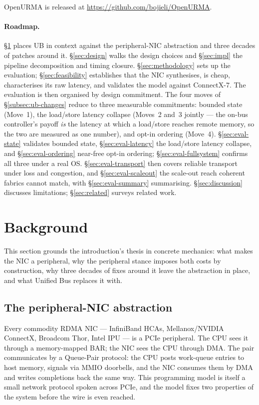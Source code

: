 \documentclass[10pt,twocolumn]{article}
\begin{document}
\noindent OpenURMA is released at
\url{https://github.com/bojieli/OpenURMA}.

\paragraph{Roadmap.}
\S\ref{sec:bg} places UB in context against the
peripheral-NIC abstraction and three decades of patches around it.
\S\ref{sec:design} walks the design choices and \S\ref{sec:impl}
the pipeline decomposition and timing closure.
\S\ref{sec:methodology} sets up the evaluation;
\S\ref{sec:feasibility} establishes that the NIC synthesises, is
cheap, characterises its raw latency, and validates the model
against ConnectX-7. The evaluation is then
organised by design commitment. The four moves of
\S\ref{subsec:ub-changes} reduce to three measurable commitments:
bounded state (Move~1), the load/store latency collapse (Moves~2
and~3 jointly --- the on-bus controller's payoff \emph{is} the
latency at which a load/store reaches remote memory, so the two are
measured as one number), and opt-in ordering (Move~4).
\S\ref{sec:eval-state} validates bounded state,
\S\ref{sec:eval-latency} the load/store latency collapse, and
\S\ref{sec:eval-ordering} near-free opt-in ordering;
\S\ref{sec:eval-fullsystem} confirms all three under a real OS.
\S\ref{sec:eval-transport} then covers reliable transport under loss
and congestion, and \S\ref{sec:eval-scaleout} the scale-out reach
coherent fabrics cannot match, with \S\ref{sec:eval-summary}
summarising. \S\ref{sec:discussion} discusses limitations;
\S\ref{sec:related} surveys related work.

\section{Background}
\label{sec:bg}

This section grounds the introduction's thesis in concrete
mechanics: what makes the NIC a peripheral, why the peripheral
stance imposes both costs by construction, why three decades of
fixes around it leave the abstraction in place, and what Unified
Bus replaces it with.

\subsection{The peripheral-NIC abstraction}
\label{subsec:qp-cost}

Every commodity RDMA NIC --- InfiniBand HCAs, Mellanox/NVIDIA
ConnectX, Broadcom Thor, Intel IPU --- is a PCIe peripheral. The
CPU sees it through a memory-mapped BAR; the NIC sees the CPU
through DMA. The pair communicates by a Queue-Pair protocol: the
CPU posts work-queue entries to host memory, signals via MMIO
doorbells, and the NIC consumes them by DMA and writes completions
back the same way. This programming model is itself a small
network protocol spoken across PCIe, and the model fixes two
properties of the system before the wire is even reached.
\end{document}
